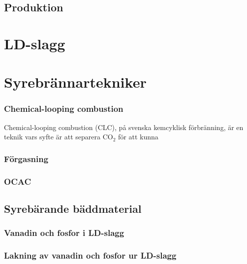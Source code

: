 \subsection{Produktion}


\section{LD-slagg}


\section{Syrebrännartekniker}

\subsubsection{Chemical-looping combustion}
Chemical-looping combustion (CLC), på svenska kemcyklisk förbränning, är en teknik vars syfte är att separera CO$_2$ för att kunna 



\subsubsection{Förgasning}


\subsubsection{OCAC}



\subsection{Syrebärande bäddmaterial}

\subsubsection{Vanadin och fosfor i LD-slagg}

\subsubsection{Lakning av vanadin och fosfor ur LD-slagg}
